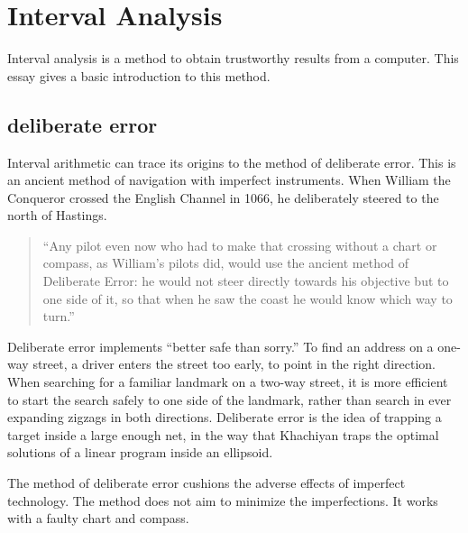 \clearpage

\section{Interval Analysis}%
\label{sec:bounds-simplex}

Interval analysis is a method to obtain trustworthy results from a
computer.  This essay gives a basic introduction to this method.

\subsection{deliberate error}

Interval arithmetic can trace its origins to the method of deliberate
error.  This is an ancient method of navigation with imperfect
instruments.  When William the Conqueror crossed the English Channel
in 1066, he deliberately steered to the north of Hastings.

\begin{quote}
  ``Any pilot even now who had to make that crossing without a chart
  or compass, as William's pilots did, would use the ancient method of
  Deliberate Error: he would not steer directly towards his objective
  but to one side of it, so that when he saw the coast he would know
  which way to turn.'' \cite[p81]{How81}
\end{quote}

Deliberate error implements ``better safe than sorry.''
To find an address on a one-way street,  a  driver enters the
street too early, to point in the right direction.  
When searching for a familiar landmark
on a two-way street, it is more efficient  
to start the search safely to one side of the landmark, 
rather than search in ever
expanding zigzags in both directions.  
Deliberate error 
is the idea of trapping a target inside a large enough net, in the
way that
Khachiyan traps the optimal solutions of a linear program inside
an ellipsoid.


The method of deliberate error cushions the adverse effects of
imperfect technology.  The method does not aim to minimize the
imperfections.  It works with a faulty chart and compass.

